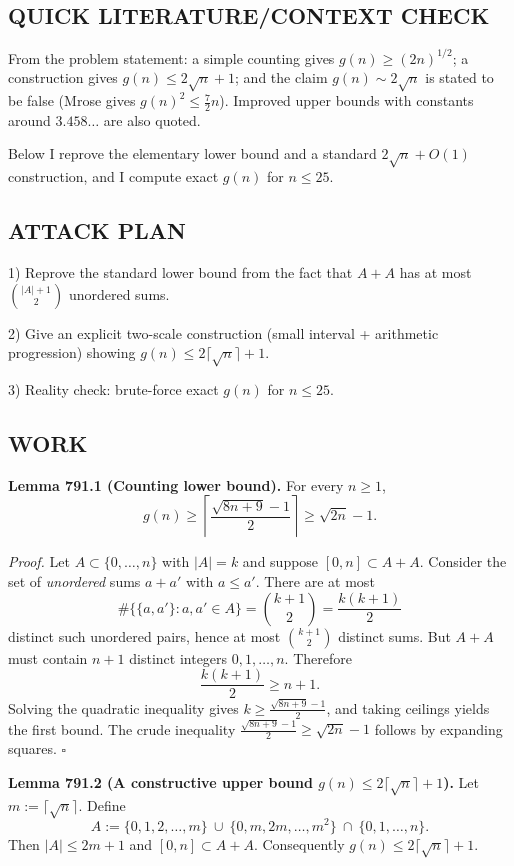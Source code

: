 \subsection*{QUICK LITERATURE/CONTEXT CHECK}
From the problem statement: a simple counting gives $g(n)\ge (2n)^{1/2}$; a construction gives $g(n)\le 2\sqrt n+1$; and the claim $g(n)\sim 2\sqrt n$ is stated to be false (Mrose gives $g(n)^2\le \tfrac72 n$). Improved upper bounds with constants around $3.458\ldots$ are also quoted.

Below I reprove the elementary lower bound and a standard $2\sqrt n+O(1)$ construction, and I compute exact $g(n)$ for $n\le 25$.

\subsection*{ATTACK PLAN}
1) Reprove the standard lower bound from the fact that $A+A$ has at most $\binom{|A|+1}{2}$ unordered sums.

2) Give an explicit two-scale construction (small interval + arithmetic progression) showing $g(n)\le 2\lceil\sqrt n\rceil+1$.

3) Reality check: brute-force exact $g(n)$ for $n\le 25$.

\subsection*{WORK}
\textbf{Lemma 791.1 (Counting lower bound).}
For every $n\ge 1$,
\[
 g(n)\ge \left\lceil\frac{\sqrt{8n+9}-1}{2}\right\rceil \ge \sqrt{2n}-1.
\]

\emph{Proof.}
Let $A\subset\{0,\dots,n\}$ with $|A|=k$ and suppose $[0,n]\subset A+A$.
Consider the set of \emph{unordered} sums $a+a'$ with $a\le a'$.
There are at most
\[
\#\{\{a,a'\}: a,a'\in A\} = \binom{k+1}{2} = \frac{k(k+1)}{2}
\]
distinct such unordered pairs, hence at most $\binom{k+1}{2}$ distinct sums.
But $A+A$ must contain $n+1$ distinct integers $0,1,\dots,n$.
Therefore
\[
\frac{k(k+1)}{2} \ge n+1.
\]
Solving the quadratic inequality gives
$k\ge \frac{\sqrt{8n+9}-1}{2}$, and taking ceilings yields the first bound.
The crude inequality $\frac{\sqrt{8n+9}-1}{2}\ge \sqrt{2n}-1$ follows by expanding squares. \hfill$\square$

\medskip
\textbf{Lemma 791.2 (A constructive upper bound $g(n)\le 2\lceil\sqrt n\rceil+1$).}
Let $m:=\lceil \sqrt n\rceil$. Define
\[
A := \{0,1,2,\dots,m\}\ \cup\ \{0,m,2m,\dots,m^2\}\ \cap\ \{0,1,\dots,n\}.
\]
Then $|A|\le 2m+1$ and $[0,n]\subset A+A$. Consequently $g(n)\le 2\lceil\sqrt n\rceil+1$.

